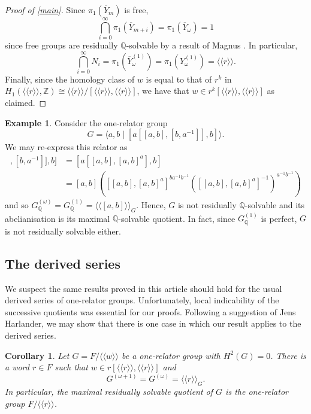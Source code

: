 \documentclass{amsart}
\newtheorem{corollary}[theorem]{Corollary}
\theoremstyle{definition}
\newtheorem{example}[theorem]{Example}
\newcommand{\Z}{\mathbb{Z}}
\newcommand{\Q}{\mathbb{Q}}
\newcommand{\isom}{\cong}
\newcommand{\normal}[1]{\langle\!\langle #1 \rangle\!\rangle}
\begin{document}
\begin{proof}[Proof of \cref{main}]
Since $\pi_1\left(\overline{Y}_m\right)$ is free, 
\[
\bigcap_{i=0}^{\infty}\pi_1\left(\overline{Y}_{m+i}\right) = \pi_1\left(\overline{Y}_{\omega}\right) = 1
\]
since free groups are residually $\Q$-solvable by a result of Magnus \cite{Ma35}. In particular, 
\[
\bigcap_{i=0}^{\infty}N_i = \pi_1\left(\overline{Y}_{\omega}^{(1)}\right) = \pi_1\left(Y_{\omega}^{(1)}\right) = \normal{r}.
\]
Finally, since the homology class of $w$ is equal to that of $r^k$ in $H_1\left(\normal{r}, \Z\right) \isom \normal{r}/[\normal{r}, \normal{r}]$, we have that $w\in r^k[\normal{r}, \normal{r}]$ as claimed.
\end{proof}


\begin{example}
Consider the one-relator group
\[
G = \langle a, b \mid [a[[a,b], [b, a^{-1}]], b]\rangle.
\]
We may re-express this relator as
\begin{align*}
[a[[a,b], [b, a^{-1}]], b] &= [a[[a,b], [a,b]^a], b]\\
					& = [a, b] \left([[a,b],[a,b]^a]^{ba^{-1}b^{-1}}\left([[a,b],[a,b]^a]^{-1}\right)^{a^{-1}b^{-1}}\right)
\end{align*}
and so $G_{\Q}^{(\omega)} = G_{\Q}^{(1)} = \normal{[a,b]}_G$. Hence, $G$ is not residually $\Q$-solvable and its abelianisation is its maximal $\Q$-solvable quotient. In fact, since $G_{\Q}^{(1)}$ is perfect, $G$ is not residually solvable either.
\end{example}



\subsection{The derived series}

We suspect the same results proved in this article should hold for the usual derived series of one-relator groups. Unfortunately, local indicability of the successive quotients was essential for our proofs. Following a suggestion of Jens Harlander, we may show that there is one case in which our result applies to the derived series.

\begin{corollary}
Let $G = F/\normal{w}$ be a one-relator group with $H^2(G) = 0$. There is a word $r\in F$ such that $w\in r[\normal{r}, \normal{r}]$ and
    \[
    G^{(\omega+1)} = G^{(\omega)} = \normal{r}_G.
    \]
In particular, the maximal residually solvable quotient of $G$ is the one-relator group $F/\normal{r}$.
\end{corollary}
\end{document}
